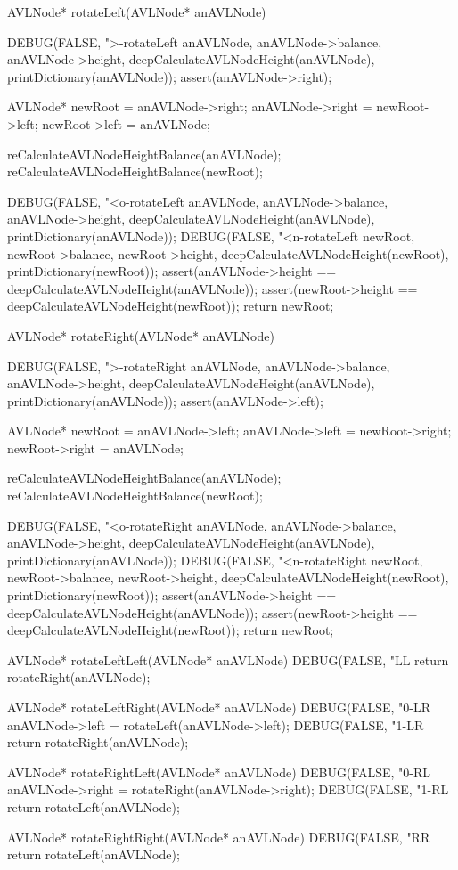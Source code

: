 AVLNode* rotateLeft(AVLNode* anAVLNode) {
  DEBUG(FALSE, ">-rotateLeft %
        anAVLNode, anAVLNode->balance, anAVLNode->height,
        deepCalculateAVLNodeHeight(anAVLNode),
        printDictionary(anAVLNode));
  assert(anAVLNode->right);

  AVLNode* newRoot = anAVLNode->right;
  anAVLNode->right = newRoot->left;
  newRoot->left    = anAVLNode;

  reCalculateAVLNodeHeightBalance(anAVLNode);
  reCalculateAVLNodeHeightBalance(newRoot);

  DEBUG(FALSE, "<o-rotateLeft %
        anAVLNode, anAVLNode->balance, anAVLNode->height,
        deepCalculateAVLNodeHeight(anAVLNode),
        printDictionary(anAVLNode));
  DEBUG(FALSE, "<n-rotateLeft %
        newRoot, newRoot->balance, newRoot->height,
        deepCalculateAVLNodeHeight(newRoot),
        printDictionary(newRoot));
  assert(anAVLNode->height == deepCalculateAVLNodeHeight(anAVLNode));
  assert(newRoot->height == deepCalculateAVLNodeHeight(newRoot));
  return newRoot;
}

AVLNode* rotateRight(AVLNode* anAVLNode) {
  DEBUG(FALSE, ">-rotateRight %
        anAVLNode, anAVLNode->balance, anAVLNode->height,
        deepCalculateAVLNodeHeight(anAVLNode),
        printDictionary(anAVLNode));
  assert(anAVLNode->left);

  AVLNode* newRoot = anAVLNode->left;
  anAVLNode->left = newRoot->right;
  newRoot->right  = anAVLNode;

  reCalculateAVLNodeHeightBalance(anAVLNode);
  reCalculateAVLNodeHeightBalance(newRoot);

  DEBUG(FALSE, "<o-rotateRight %
        anAVLNode, anAVLNode->balance, anAVLNode->height,
        deepCalculateAVLNodeHeight(anAVLNode),
        printDictionary(anAVLNode));
  DEBUG(FALSE, "<n-rotateRight %
        newRoot, newRoot->balance, newRoot->height,
        deepCalculateAVLNodeHeight(newRoot),
        printDictionary(newRoot));
  assert(anAVLNode->height == deepCalculateAVLNodeHeight(anAVLNode));
  assert(newRoot->height == deepCalculateAVLNodeHeight(newRoot));
  return newRoot;
}

AVLNode* rotateLeftLeft(AVLNode* anAVLNode) {
  DEBUG(FALSE, "LL %
  return rotateRight(anAVLNode);
}

AVLNode* rotateLeftRight(AVLNode* anAVLNode) {
  DEBUG(FALSE, "0-LR %
  anAVLNode->left = rotateLeft(anAVLNode->left);
  DEBUG(FALSE, "1-LR %
  return rotateRight(anAVLNode);
}

AVLNode* rotateRightLeft(AVLNode* anAVLNode) {
  DEBUG(FALSE, "0-RL %
  anAVLNode->right = rotateRight(anAVLNode->right);
  DEBUG(FALSE, "1-RL %
  return rotateLeft(anAVLNode);
}

AVLNode* rotateRightRight(AVLNode* anAVLNode) {
  DEBUG(FALSE, "RR %
  return rotateLeft(anAVLNode);
}

\stoptyping